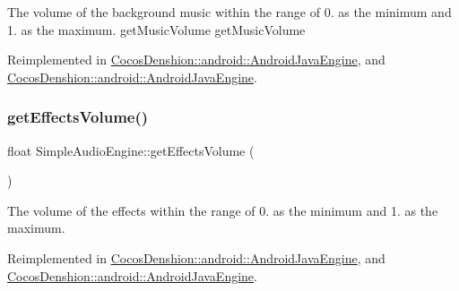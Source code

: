 The volume of the background music within the range of 0. as the minimum and 1. as the maximum.  get\+Music\+Volume  get\+Music\+Volume 

Reimplemented in \hyperlink{classCocosDenshion_1_1android_1_1AndroidJavaEngine_ae645138af1efe4007a90acd55fa55233}{Cocos\+Denshion\+::android\+::\+Android\+Java\+Engine}, and \hyperlink{classCocosDenshion_1_1android_1_1AndroidJavaEngine_ab9c6ae5e936cb51283f804e163947e2c}{Cocos\+Denshion\+::android\+::\+Android\+Java\+Engine}.

\mbox{\label{classCocosDenshion_1_1SimpleAudioEngine_a9bf72f162462408313d4e0085337e4ef}} 
\subsubsection{\texorpdfstring{get\+Effects\+Volume()}{getEffectsVolume()}\hspace{0.1cm}{\footnotesize\ttfamily [1/2]}}
{\footnotesize\ttfamily float Simple\+Audio\+Engine\+::get\+Effects\+Volume (\begin{DoxyParamCaption}{ }\end{DoxyParamCaption})\hspace{0.3cm}{\ttfamily [virtual]}}

The volume of the effects within the range of 0. as the minimum and 1. as the maximum. 

Reimplemented in \hyperlink{classCocosDenshion_1_1android_1_1AndroidJavaEngine_aea7bc49b13e8823e9a64c9117d44fc09}{Cocos\+Denshion\+::android\+::\+Android\+Java\+Engine}, and \hyperlink{classCocosDenshion_1_1android_1_1AndroidJavaEngine_a21e1cc7de8f050587bbcf35e46add189}{Cocos\+Denshion\+::android\+::\+Android\+Java\+Engine}.

\mbox{\label{classCocosDenshion_1_1SimpleAudioEngine_a6bd483609e96ee35f1ebf55b56be7770}} 
